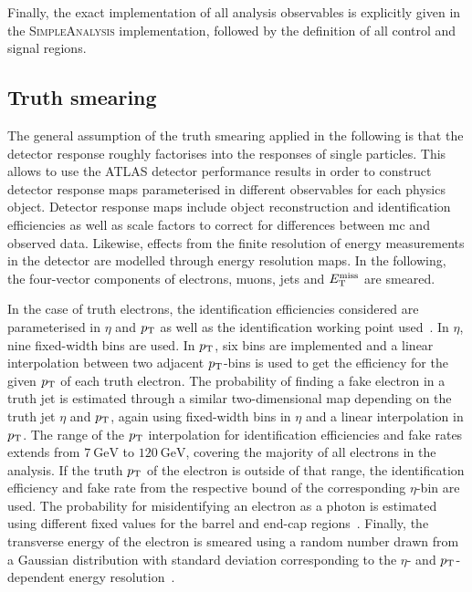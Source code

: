 Finally, the exact implementation of all analysis observables is explicitly given in the \mbox{\textsc{SimpleAnalysis}} implementation, followed by the definition of all control and signal regions.

\subsection{Truth smearing}\label{sec:truth_smearing}

The general assumption of the truth smearing applied in the following is that the detector response roughly factorises into the responses of single particles. This allows to use the ATLAS detector performance results in order to construct detector response maps parameterised in different observables for each physics object. Detector response maps include object reconstruction and identification efficiencies as well as scale factors to correct for differences between \gls{mc} and observed data. Likewise, effects from the finite resolution of energy measurements in the detector are modelled through energy resolution maps. In the following, the four-vector components of electrons, muons, jets and $E_{\textrm{T}}^{\textrm{miss}}$ are smeared. 

In the case of truth electrons, the identification efficiencies considered are parameterised in $\eta$ and $p_{\textrm{T}}$ as well as the identification working point used~\cite{PERF-2017-01}. In $\eta$, nine fixed-width bins are used. In $p_{\textrm{T}}$, six bins are implemented and a linear interpolation between two adjacent $p_{\textrm{T}}$-bins is used to get the efficiency for the given $p_{\textrm{T}}$ of each truth electron. The probability of finding a fake electron in a truth jet is estimated through a similar two-dimensional map depending on the truth jet $\eta$ and $p_{\textrm{T}}$, again using fixed-width bins in $\eta$ and a linear interpolation in $p_{\textrm{T}}$.%
The range of the $p_{\textrm{T}}$ interpolation for identification efficiencies and fake rates extends from $\SI{7}{\GeV}$ to $\SI{120}{\GeV}$, covering the majority of all electrons in the analysis. If the truth $p_{\textrm{T}}$ of the electron is outside of that range, the identification efficiency and fake rate from the respective bound of the corresponding $\eta$-bin are used. The probability for misidentifying an electron as a photon is estimated using different fixed values for the barrel and end-cap regions~\cite{PERF-2017-02}. Finally, the transverse energy of the electron is smeared using a random number drawn from a Gaussian distribution with  standard deviation corresponding to the $\eta$- and $p_{\textrm{T}}$-dependent energy resolution~\cite{PERF-2017-03}.

